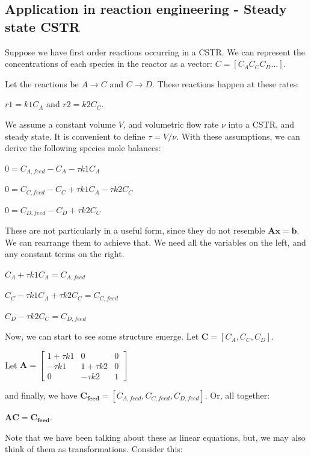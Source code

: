 \documentclass[11pt]{article}
\begin{document}
\subsection{Application in reaction engineering - Steady state CSTR}
\label{sec:org7434d54}

Suppose we have first order reactions occurring in a CSTR. We can represent the concentrations of each species in the reactor as a vector: \(C = [C_A C_C C_D ...]\).

Let the reactions be \(A \rightarrow C\) and \(C \rightarrow D\). These reactions happen at these rates:

\(r1 = k1 C_A\) and \(r2 = k2 C_C\).

We assume a constant volume \(V\), and volumetric flow rate \(\nu\) into a CSTR, and steady state. It is convenient to define \(\tau = V / \nu\). With these assumptions, we can derive the following species mole balances:

\(0 = C_{A, feed} - C_A - \tau k1 C_A\)

\(0 = C_{C, feed} - C_C + \tau k1 C_A - \tau k2 C_C\)

\(0 = C_{D, feed} - C_D + \tau k2 C_C\)

These are not particularly in a useful form, since they do not resemble \(\mathbf{A} \mathbf{x} = \mathbf{b}\). We can rearrange them to achieve that. We need all the variables on the left, and any constant terms on the right.

\(C_A + \tau k1 C_A = C_{A, feed}\)

\(C_C - \tau k1 C_A + \tau k2 C_C = C_{C, feed}\)

\(C_D - \tau k2 C_C = C_{D, feed}\)

Now, we can start to see some structure emerge. Let \(\mathbf{C} = [C_A, C_C, C_D]\).

Let \(\mathbf{A} = \left[\begin{array}{ccc}
 1 + \tau k1 & 0 & 0 \\
 -\tau k1 & 1 + \tau k2 & 0 \\
 0 & -\tau k2 & 1
 \end{array}\right]\)

and finally, we have \(\mathbf{C_{feed}} = [C_{A,feed}, C_{C, feed}, C_{D, feed}]\). Or, all together:

\(\mathbf{A} \mathbf{C} = \mathbf{C_{feed}}\).

Note that we have been talking about these as linear equations, but,  we may also think of them as transformations. Consider this:
\end{document}
